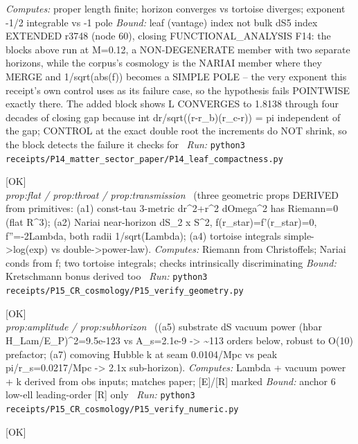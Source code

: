 \begin{description}
\emph{Computes:} proper length finite; horizon converges vs tortoise diverges; exponent -1/2 integrable vs -1 pole
 \emph{Bound:} leaf (vantage) index not bulk dS5 index EXTENDED r3748 (node 60), closing FUNCTIONAL\_ANALYSIS F14: the blocks above run at M=0.12, a NON-DEGENERATE member with two separate horizons, while the corpus's cosmology is the NARIAI member where they MERGE and 1/sqrt(abs(f)) becomes a SIMPLE POLE -- the very exponent this receipt's own control uses as its failure case, so the hypothesis fails POINTWISE exactly there. The added block shows L CONVERGES to 1.8138 through four decades of closing gap because int dr/sqrt((r-r\_b)(r\_c-r)) = pi independent of the gap; CONTROL at the exact double root the increments do NOT shrink, so the block detects the failure it checks for
\ \emph{Run:} \texttt{python3 receipts/P14\_matter\_sector\_paper/P14\_leaf\_compactness.py}
\item[\label{rcpt:P15_verify_geometry}\texttt{P15\_verify\_geometry}]\hfill\textsf{[OK]}\\
\textit{prop:flat / prop:throat / prop:transmission} \ (three geometric props DERIVED from primitives: (a1) const-tau 3-metric dr\textasciicircum{}2+r\textasciicircum{}2 dOmega\textasciicircum{}2 has Riemann=0 (flat R\textasciicircum{}3); (a2) Nariai near-horizon dS\_2 x S\textasciicircum{}2, f(r\_star)=f'(r\_star)=0, f''=-2Lambda, both radii 1/sqrt(Lambda); (a4) tortoise integrals simple->log(exp) vs double->power-law). 
\emph{Computes:} Riemann from Christoffels; Nariai conds from f; two tortoise integrals; checks intrinsically discriminating
 \emph{Bound:} Kretschmann bonus derived too
\ \emph{Run:} \texttt{python3 receipts/P15\_CR\_cosmology/P15\_verify\_geometry.py}
\item[\label{rcpt:P15_verify_numeric}\texttt{P15\_verify\_numeric}]\hfill\textsf{[OK]}\\
\textit{prop:amplitude / prop:subhorizon} \ ((a5) substrate dS vacuum power (hbar H\_Lam/E\_P)\textasciicircum{}2=9.5e-123 vs A\_s=2.1e-9 -> \textasciitilde{}113 orders below, robust to O(10) prefactor; (a7) comoving Hubble k at seam 0.0104/Mpc vs peak pi/r\_s=0.0217/Mpc -> 2.1x sub-horizon). 
\emph{Computes:} Lambda + vacuum power + k derived from obs inputs; matches paper; [E]/[R] marked
 \emph{Bound:} anchor 6 low-ell leading-order [R] only
\ \emph{Run:} \texttt{python3 receipts/P15\_CR\_cosmology/P15\_verify\_numeric.py}
\item[\label{rcpt:P15_verify_coherence_comb}\texttt{P15\_verify\_coherence\_comb}]\hfill\textsf{[OK]}\\

\end{description}

